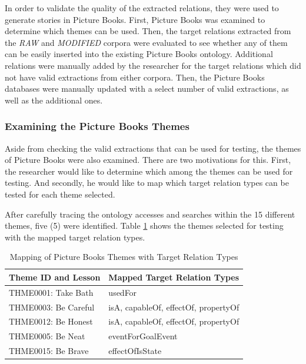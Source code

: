 In order to validate the quality of the extracted relations, they were used to generate stories in Picture Books. First, Picture Books was examined to determine which themes can be used. Then, the target relations extracted from the \textit{RAW} and \textit{MODIFIED} corpora were evaluated to see whether any of them can be easily inserted into the existing Picture Books ontology. Additional relations were manually added by the researcher for the target relations which did not have valid extractions from either corpora. Then, the Picture Books databases were manually updated with a select number of valid extractions, as well as the additional ones. 

\subsubsection*{Examining the Picture Books Themes}
\label{sec:examinethemes}

Aside from checking the valid extractions that can be used for testing, the themes of Picture Books were also examined. There are two motivations for this. First, the researcher would like to determine which among the themes can be used for testing. And secondly, he would like to map which target relation types can be tested for each theme selected.

After carefully tracing the ontology accesses and searches within the 15 different themes, five (5) were identified. Table \ref{tab:mapthemerel} shows the themes selected for testing with the mapped target relation types.

\begin{table}[H]   %
\centering
\caption{Mapping of Picture Books Themes with Target Relation Types} \vspace{0.25em}
\begin{tabular}{|p{5cm}|p{5cm}|} \hline
\textbf{Theme ID and Lesson} & \textbf{Mapped Target Relation Types} \\ \hline
THME0001: Take Bath			& usedFor \\ \hline
THME0003: Be Careful		& isA, capableOf, effectOf, propertyOf \\ \hline
THME0012: Be Honest			& isA, capableOf, effectOf, propertyOf \\ \hline
THME0005: Be Neat			& eventForGoalEvent \\ \hline
THME0015: Be Brave			& effectOfIsState \\ \hline
\end{tabular}
\label{tab:mapthemerel}
\end{table}  

